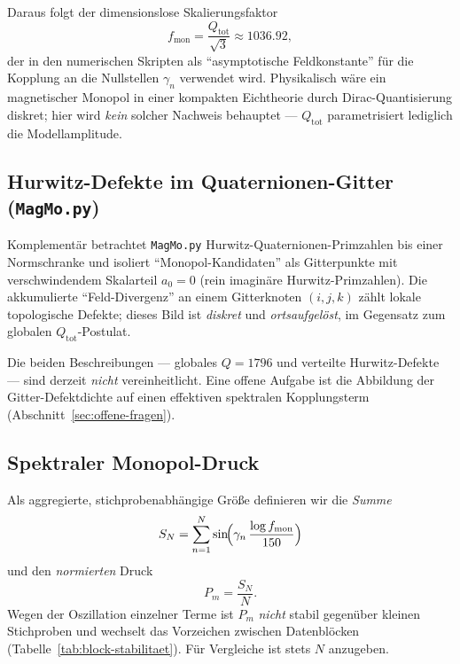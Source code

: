 \documentclass[11pt,a4paper]{article}
\newcommand{\monopolFactor}{1036.92} %
\begin{document}
Daraus folgt der dimensionslose Skalierungsfaktor
\begin{equation}
  f_{\mathrm{mon}} = \frac{Q_{\mathrm{tot}}}{\sqrt{3}} \approx \monopolFactor,
  \label{eq:fmon}
\end{equation}
der in den numerischen Skripten als ``asymptotische Feldkonstante'' für die
Kopplung an die Nullstellen $\gamma_n$ verwendet wird. Physikalisch wäre ein
magnetischer Monopol in einer kompakten Eichtheorie durch Dirac-Quantisierung
diskret; hier wird \emph{kein} solcher Nachweis behauptet --- $Q_{\mathrm{tot}}$
parametrisiert lediglich die Modellamplitude.

\subsection{Hurwitz-Defekte im Quaternionen-Gitter (\texttt{MagMo.py})}

Komplementär betrachtet \texttt{MagMo.py} Hurwitz-Quaternionen-Primzahlen bis
einer Normschranke und isoliert ``Monopol-Kandidaten'' als Gitterpunkte mit
verschwindendem Skalarteil $a_0=0$ (rein imaginäre Hurwitz-Primzahlen).
Die akkumulierte ``Feld-Divergenz'' an einem Gitterknoten $(i,j,k)$ zählt
lokale topologische Defekte; dieses Bild ist \emph{diskret} und \emph{ortsaufgelöst},
im Gegensatz zum globalen $Q_{\mathrm{tot}}$-Postulat.

Die beiden Beschreibungen --- globales $Q=1796$ und verteilte Hurwitz-Defekte ---
sind derzeit \emph{nicht} vereinheitlicht. Eine offene Aufgabe ist die Abbildung
der Gitter-Defektdichte auf einen effektiven spektralen Kopplungsterm
(Abschnitt~\ref{sec:offene-fragen}).

\subsection{Spektraler Monopol-Druck}

Als aggregierte, stichprobenabhängige Größe definieren wir die \emph{Summe}
\begin{equation}
  S_N = \sum_{n=1}^{N} \sin\!\Bigl(\gamma_n \,\frac{\log f_{\mathrm{mon}}}{150}\Bigr)
  \label{eq:pressure-sum}
\end{equation}
und den \emph{normierten} Druck
\begin{equation}
  P_m = \frac{S_N}{N}.
  \label{eq:pressure-pm}
\end{equation}
Wegen der Oszillation einzelner Terme ist $P_m$ \emph{nicht} stabil gegenüber
kleinen Stichproben und wechselt das Vorzeichen zwischen Datenblöcken
(Tabelle~\ref{tab:block-stabilitaet}). Für Vergleiche ist stets $N$ anzugeben.
\end{document}
